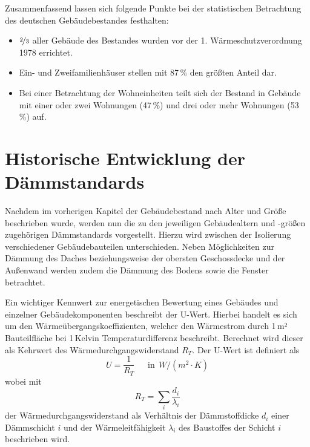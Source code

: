 Zusammenfassend lassen sich folgende Punkte bei der statistischen Betrachtung des deutschen Gebäudebestandes festhalten:

\begin{itemize}
	\item $\nicefrac{2}{3}$ aller Gebäude des Bestandes wurden vor der 1. Wärmeschutzverordnung 1978 errichtet.
	\item Ein- und Zweifamilienhäuser stellen mit 87\,\% den größten Anteil dar.
	\item Bei einer Betrachtung der Wohneinheiten teilt sich der Bestand in Gebäude mit einer oder zwei Wohnungen (47\,\%) und drei oder mehr Wohnungen (53\,\%) auf.
\end{itemize}







\section{Historische Entwicklung der Dämmstandards}
\label{sec:Sektion 22}

Nachdem im vorherigen Kapitel der Gebäudebestand nach Alter und Größe beschrieben wurde, werden nun die zu den jeweiligen Gebäudealtern und -größen zugehörigen Dämmstandards vorgestellt. 
Hierzu wird zwischen der Isolierung verschiedener Gebäudebauteilen unterschieden. 
Neben Möglichkeiten zur Dämmung des Daches beziehungsweise der obersten Geschossdecke und der Außenwand werden zudem die Dämmung des Bodens sowie die Fenster betrachtet.

Ein wichtiger Kennwert zur energetischen Bewertung eines Gebäudes und einzelner Gebäudekomponenten beschreibt der U-Wert.
Hierbei handelt es sich um den Wärmeübergangskoeffizienten, welcher den Wärmestrom durch 1\,m² Bauteilfläche bei 1\,Kelvin Temperaturdifferenz beschreibt. 
Berechnet wird dieser als Kehrwert des Wärmedurchgangswiderstand \(R_T\). 
Der U-Wert ist definiert als
\begin{equation}
\label{eq:Gleichung221}
U = \frac{1}{R_T}  \ \ \ \ \ \ \ \text{in} \ \ W/(m^2 \cdot K)
\end{equation}
wobei mit
\begin{equation}
\label{eq:Gleichung222}
R_T = \sum \limits_{i} \frac{d_i}{\lambda_i}	
\end{equation}				%
der Wärmedurchgangswiderstand als Verhältnis der Dämmstoffdicke \(d_i\) einer Dämmschicht \(i\) und der Wärmeleitfähigkeit \(\lambda_i\) des Baustoffes der Schicht \(i\) beschrieben wird. 

